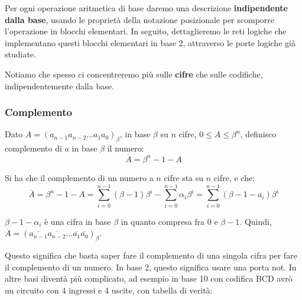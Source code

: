 \documentclass[a4paper,11pt]{article}
\begin{document}
Per ogni operazione aritmetica di base daremo una descrizione \textbf{indipendente dalla base}, usando le proprietà della notazione posizionale per scomporre l'operazione in blocchi elementari.
In seguito, dettaglieremo le reti logiche che implementano questi blocchi elementari in base 2, attraverso le porte logiche già studiate.

Notiamo che spesso ci concentreremo più sulle \textbf{cifre} che sulle codifiche, indipendentemente dalla base.

\subsubsection{Complemento}
Dato $A = (a_{n-1} a_{n-2} ... a_1 a_0)_\beta$, in base $\beta$ su $n$ cifre, $0 \leq A \leq \beta^n$, definisco complemento di $a$ in base $\beta$ il numero:
$$
\overline{A} = \beta^n - 1 - A
$$

Si ha che il complemento di un numero a $n$ cifre sta su $n$ cifre,  e che:
$$
\overline{A} = \beta^n - 1 - A = \sum_{i=0}^{n-1} (\beta - 1) \beta^i - \sum_{i=0}^{n-1} \alpha_i \beta^i = \sum_{i = 0}^{n-1} (\beta - 1 - a_i)\beta^i
$$

$\beta - 1 -\alpha_i$ è una cifra in base $\beta$ in quanto compresa fra $0$ e $\beta - 1$.
Quindi, $\overline{A} = (\overline{a_{n-1}} \overline{a_{n-2}} ... \overline{a_{1}} \overline{a_{0}})_\beta$.

Questo significa che basta saper fare il complemento di una singola cifra per fare il complemento di un numero.
In base 2, questo significa usare una porta not.
In altre basi diventà più complicato, ad esempio in base 10 con codifica BCD avrò un circuito con 4 ingressi e 4 uscite, con tabella di verità:
\end{document}
